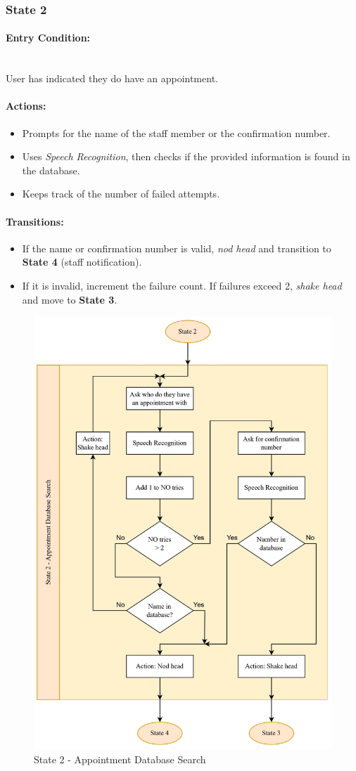 \documentclass[conference]{IEEEtran}
\begin{document}
\subsubsection{State 2}
\paragraph{Entry Condition:}
\mbox{}\\
User has indicated they do have an appointment.

\paragraph{Actions:}
\begin{itemize}
  \item Prompts for the name of the staff member or the confirmation number.
  \item Uses \emph{Speech Recognition}, then checks if the provided information is found in the database.
  \item Keeps track of the number of failed attempts.
\end{itemize}

\paragraph{Transitions:}
\begin{itemize}
  \item If the name or confirmation number is valid, \emph{nod head} and transition to \textbf{State 4} (staff notification).
  \item If it is invalid, increment the failure count. If failures exceed 2, \emph{shake head} and move to \textbf{State 3}.
\end{itemize}

\begin{figure}
    \centering
    \includegraphics[width=.6\linewidth]{State 2 - Appointment Database Search.jpg}
    \caption{State 2 - Appointment Database Search}
    \label{State 2 - Appointment Database Search}
\end{figure}
\end{document}
